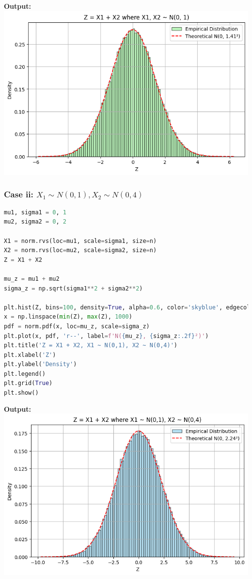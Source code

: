 \documentclass[12pt]{article}
\begin{document}
\textbf{Output:} \\
\includegraphics[width=0.8\linewidth]{normal_0_1.png}

\subsubsection*{Case ii: \( X_1 \sim N(0,1), X_2 \sim N(0,4) \)}
\begin{lstlisting}[language=Python]
mu1, sigma1 = 0, 1
mu2, sigma2 = 0, 2

X1 = norm.rvs(loc=mu1, scale=sigma1, size=n)
X2 = norm.rvs(loc=mu2, scale=sigma2, size=n)
Z = X1 + X2

mu_z = mu1 + mu2
sigma_z = np.sqrt(sigma1**2 + sigma2**2)

plt.hist(Z, bins=100, density=True, alpha=0.6, color='skyblue', edgecolor='black')
x = np.linspace(min(Z), max(Z), 1000)
pdf = norm.pdf(x, loc=mu_z, scale=sigma_z)
plt.plot(x, pdf, 'r--', label=f'N({mu_z}, {sigma_z:.2f}²)')
plt.title('Z = X1 + X2, X1 ~ N(0,1), X2 ~ N(0,4)')
plt.xlabel('Z')
plt.ylabel('Density')
plt.legend()
plt.grid(True)
plt.show()
\end{lstlisting}

\textbf{Output:} \\
\includegraphics[width=0.8\linewidth]{normal_0_4.png}
\end{document}
